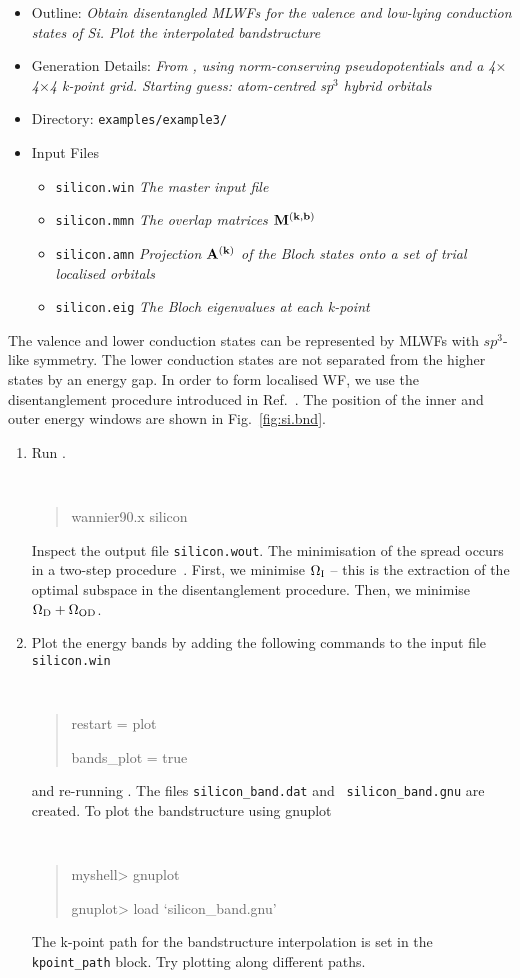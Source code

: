 \documentclass[a4paper,11pt,twoside]{article}
\begin{document}
\begin{itemize}
\item{Outline: \it{Obtain disentangled MLWFs for the valence and
      low-lying conduction states of Si. Plot the interpolated
      bandstructure}}
\item{Generation Details: \it{From \pwscf, using norm-conserving
    pseudopotentials and a 4$\times$4$\times$4 k-point grid. Starting
    guess: atom-centred sp$^3$ hybrid orbitals}} 
\item{Directory: {\tt examples/example3/}}
\item{Input Files}
\begin{itemize}
\item{ {\tt silicon.win}  {\it The master input file}}
\item{ {\tt silicon.mmn}  {\it The overlap matrices $\mathbf{M}^{(\mathbf{k},\mathbf{b})}$}}
\item{ {\tt silicon.amn}  {\it Projection $\mathbf{A}^{(\mathbf{k})}$ of the Bloch states onto a
    set of trial localised orbitals}} 
\item{ {\tt silicon.eig}  {\it The Bloch eigenvalues at each k-point}}
\end{itemize}
\end{itemize}
The valence and lower conduction states can be represented by MLWFs
with $sp^3$-like symmetry. The lower conduction states are not 
separated from the higher states by an energy gap. In order to form
localised WF, we use the disentanglement procedure
introduced in Ref.~\cite{souza-prb01}. The position of the inner and outer
energy windows are shown in Fig.~\ref{fig:si.bnd}. 
\begin{enumerate}
\item Run \wannier.
{\tt
\begin{quote}
wannier90.x silicon
\end{quote} }
Inspect the output file {\tt silicon.wout}. The minimisation of the
spread occurs in a two-step procedure~\cite{souza-prb01}. First, we minimise
$\Omega_{\rm I}$ -- this is the extraction of the optimal subspace in
the disentanglement procedure. Then, we minimise $\Omega_{\rm D} +
\Omega_{{\rm OD}}$.

\item Plot the energy bands by adding the following
  commands to the input file {\tt silicon.win} {\tt
\begin{quote}
restart = plot

bands\_plot = true
\end{quote} }
and re-running \wannier. The files {\tt silicon\_band.dat} and {\tt
  silicon\_band.gnu} are created. 
To plot the bandstructure using gnuplot
\smallskip
{\tt
\begin{quote}
myshell> gnuplot

gnuplot> load `silicon\_band.gnu'
\end{quote} }
The k-point path for the bandstructure interpolation is set in the {\tt
  kpoint\_path} block. Try plotting along different paths. 
\end{enumerate}
\end{document}
